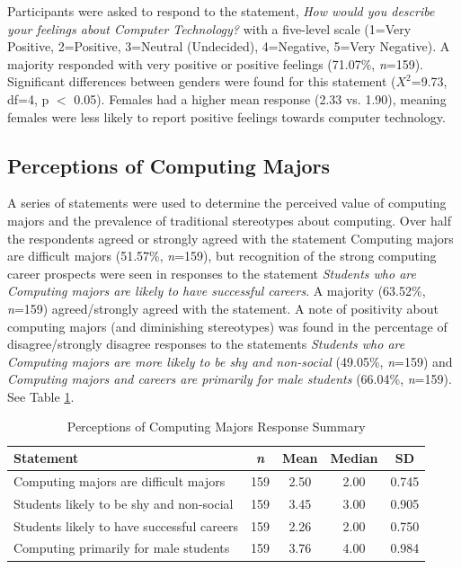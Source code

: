 \documentclass{article}
\begin{document}
Participants were asked to respond to the statement, \textit{How would you describe your feelings about Computer Technology?} with a five-level scale (1=Very Positive, 2=Positive, 3=Neutral (Undecided), 4=Negative, 5=Very Negative). A majority responded with very positive or positive feelings (71.07\%, \textit{n}=159). Significant differences between genders were found for this statement ($X^2$=9.73, df=4, p $<$ 0.05). Females had a higher mean response (2.33 vs. 1.90), meaning females were less likely to report positive feelings towards computer technology.

\subsection{Perceptions of Computing Majors}
A series of statements were used to determine the perceived value of computing majors and the prevalence of traditional stereotypes about computing. Over half the respondents agreed or strongly agreed with the statement Computing majors are difficult majors (51.57\%, \textit{n}=159), but recognition of the strong computing career prospects were seen in responses to the statement \textit{Students who are Computing majors are likely to have successful careers}. A majority (63.52\%, \textit{n}=159) agreed/strongly agreed with the statement. A note of positivity about computing majors (and diminishing stereotypes) was found in the percentage of disagree/strongly disagree responses to the statements \textit{Students who are Computing majors are more likely to be shy and non-social} (49.05\%, \textit{n}=159) and \textit{Computing majors and careers are primarily for male students} (66.04\%, \textit{n}=159). See Table \ref{table:compmaj}.

\begin{table}[h]
\caption{Perceptions of Computing Majors Response Summary} %
\label{table:compmaj} %
\centering %
\begin{tabular}{l c c c c } %
\hline\hline %
Statement & \textit{n} & Mean & Median & SD \\  %
\hline %
Computing majors are difficult majors & 159 & 2.50 & 2.00 & 0.745 \\
Students likely to be shy and non-social & 159 & 3.45 & 3.00 & 0.905 \\
Students likely to have successful careers & 159 & 2.26 & 2.00 & 0.750 \\
Computing primarily for male students & 159 & 3.76 & 4.00 & 0.984 \\
\hline %
\end{tabular}
\end{table}
\end{document}
